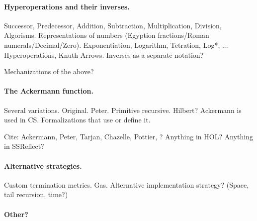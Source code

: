 \paragraph{Hyperoperations and their inverses.}

Successor, Predecessor, Addition, Subtraction, Multiplication, Division, Algorisms.  Representations of numbers (Egyption fractions/Roman numerals/Decimal/Zero).  Exponentiation, Logarithm, Tetration, Log*, ...   Hyperoperations, Knuth Arrows.  Inverses as a separate notation?

Mechanizations of the above?

\paragraph{The Ackermann function.}

Several variations.  Original.  Peter.  Primitive recursive.  Hilbert?  Ackermann is used in CS.  Formalizations that use or define it.

Cite: Ackermann, Peter, Tarjan, Chazelle, Pottier, ?  Anything in HOL?  Anything in SSReflect?

\paragraph{Alternative strategies.}

Custom termination metrics.  Gas.  Alternative implementation strategy?  (Space, tail recursion, time?)

\paragraph{Other?}